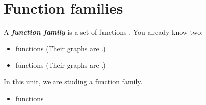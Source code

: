 \section{Function families}

A {\bfseries\itshape function family} is a set of functions . 
You already know two:
\begin{itemize}
    \item {} functions (Their graphs are .)
    \item {} functions (Their graphs are .)
\end{itemize}

In this unit, we are studing a  function family.
\begin{itemize}
    \item {} functions 
\end{itemize}



%
\hfill 
%
%
\hfill 
%
